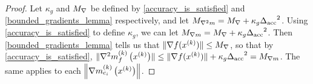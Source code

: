 \begin{proof}
Let $\kappa_g$ and ${M_{\nabla}}$ be defined by \cref{accuracy_is_satisfied} and \cref{bounded_gradients_lemma} respectively,
and let ${M_{\nabla^2 m}} = {M_{\nabla}} + \kappa_g {\Delta_{\textrm{acc}}}^2$.
Using \cref{accuracy_is_satisfied} to define $\kappa_g$, we can let ${M_{\nabla m}} = {M_{\nabla}} + \kappa_g {\Delta_{\textrm{acc}}}^2$.
Then \cref{bounded_gradients_lemma} tells us that
$\|\nabla f(x^{(k)})\| \le {M_{\nabla}}$, so that by \cref{accuracy_is_satisfied},
$\|{\nabla^2m_f^{(k)}\left(x^{(k)}\right)}\| \le \|\nabla f(x^{(k)})\| + \kappa_g{\Delta_{\textrm{acc}}}^2 = {M_{\nabla m}}$.
The same applies to each $\left\|{\nabla m_{c_i}^{(k)}\left(x^{(k)}\right)}\right\|$.
\end{proof}



